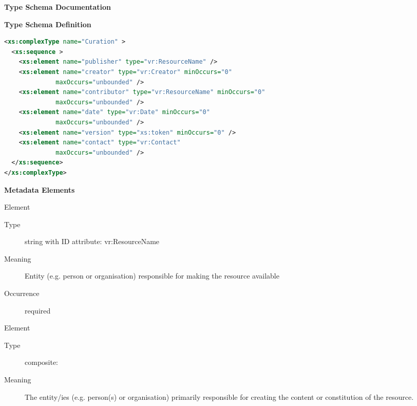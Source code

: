 \documentclass[11pt,a4paper]{ivoa}
\begin{document}
\begin{generated}
\begingroup
      	\renewcommand*\descriptionlabel[1]{%
      	\hbox to 5.5em{\emph{#1}\hfil}}\vspace{2ex}\noindent\textbf{ Type Schema Documentation}


\vspace{1ex}\noindent\textbf{ Type Schema Definition}

\begin{lstlisting}[language=XML,basicstyle=\footnotesize]
<xs:complexType name="Curation" >
  <xs:sequence >
    <xs:element name="publisher" type="vr:ResourceName" />
    <xs:element name="creator" type="vr:Creator" minOccurs="0"
              maxOccurs="unbounded" />
    <xs:element name="contributor" type="vr:ResourceName" minOccurs="0"
              maxOccurs="unbounded" />
    <xs:element name="date" type="vr:Date" minOccurs="0"
              maxOccurs="unbounded" />
    <xs:element name="version" type="xs:token" minOccurs="0" />
    <xs:element name="contact" type="vr:Contact"
              maxOccurs="unbounded" />
  </xs:sequence>
</xs:complexType>
\end{lstlisting}

\vspace{0.5ex}\noindent\textbf{ Metadata Elements}

\begingroup\small\begin{bigdescription}\item[Element \xmlel{publisher}]
\begin{description}
\item[Type] string with ID attribute: vr:ResourceName
\item[Meaning] 
               Entity (e.g. person or organisation) responsible for making the 
               resource available
             
\item[Occurrence] required

\end{description}
\item[Element \xmlel{creator}]
\begin{description}
\item[Type] composite: 
\item[Meaning] 
                The entity/ies (e.g. person(s) or organisation) primarily responsible 
                for creating the content or constitution of the resource.
             

\end{description}
\end{bigdescription}
\end{generated}
\end{document}
